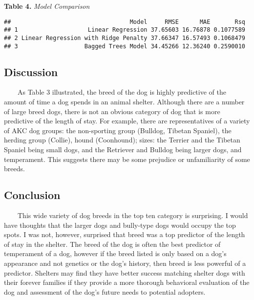 \documentclass[
  11pt,
]{article}
\begin{document}
\textbf{Table 4.} \emph{Model Comparison}

\begin{verbatim}
##                                  Model     RMSE      MAE       Rsq
## 1                    Linear Regression 37.65603 16.76878 0.1077589
## 2 Linear Regression with Ridge Penalty 37.66347 16.57493 0.1068479
## 3                   Bagged Trees Model 34.45266 12.36240 0.2590010
\end{verbatim}

\hypertarget{discussion}{%
\subsection{Discussion}\label{discussion}}

~~~~As Table 3 illustrated, the breed of the dog is highly predictive of
the amount of time a dog spends in an animal shelter. Although there are
a number of large breed dogs, there is not an obvious category of dog
that is more predictive of the length of stay. For example, there are
representatives of a variety of AKC dog groups: the non-sporting group
(Bulldog, Tibetan Spaniel), the herding group (Collie), hound
(Coonhound); sizes: the Terrier and the Tibetan Spaniel being small
dogs, and the Retriever and Bulldog being larger dogs, and temperament.
This suggests there may be some prejudice or unfamiliarity of some
breeds.

\hypertarget{conclusion}{%
\subsection{Conclusion}\label{conclusion}}

~~~~This wide variety of dog breeds in the top ten category is
surprising. I would have thoughts that the larger dogs and bully-type
dogs would occupy the top spots. I was not, however, surprised that
breed was a top predictor of the length of stay in the shelter. The
breed of the dog is often the best predictor of temperament of a dog,
however if the breed listed is only based on a dog's appearance and not
genetics or the dog's history, then breed is less powerful of a
predictor. Shelters may find they have better success matching shelter
dogs with their forever families if they provide a more thorough
behavioral evaluation of the dog and assessment of the dog's future
needs to potential adopters.
\end{document}
